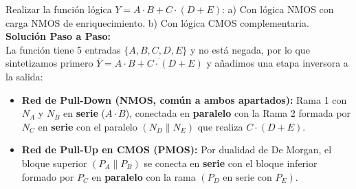 \begin{ejercicio}[Síntesis de $Y = A \cdot B + C \cdot (D + E)$ --- Examen Enero 2020 FFT]
Realizar la función lógica $Y = A \cdot B + C \cdot (D + E)$:
a) Con lógica NMOS con carga NMOS de enriquecimiento. \quad b) Con lógica CMOS complementaria.
\tcbline
\textbf{Solución Paso a Paso:}\\[4pt]
La función tiene 5 entradas $\{A, B, C, D, E\}$ y no está negada, por lo que sintetizamos primero $\overline{Y} = \overline{A \cdot B + C \cdot (D + E)}$ y añadimos una etapa inversora a la salida:
\begin{itemize}[leftmargin=*]
    \item \textbf{Red de Pull-Down (NMOS, común a ambos apartados):}
    Rama 1 con $N_A$ y $N_B$ en \textbf{serie} ($A \cdot B$), conectada en \textbf{paralelo} con la Rama 2 formada por $N_C$ en \textbf{serie} con el paralelo $(N_D \parallel N_E)$ que realiza $C \cdot (D + E)$.
    \item \textbf{Red de Pull-Up en CMOS (PMOS):}
    Por dualidad de De Morgan, el bloque superior $(P_A \parallel P_B)$ se conecta en \textbf{serie} con el bloque inferior formado por $P_C$ en \textbf{paralelo} con la rama $(P_D \text{ en serie con } P_E)$.
\end{itemize}


\end{ejercicio}
